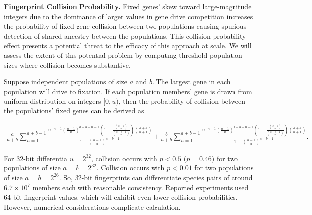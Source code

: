 \textbf{Fingerprint Collision Probability.}
Fixed genes' skew toward large-magnitude integers due to the dominance of larger values in gene drive competition increases the probability of fixed-gene collision between two populations causing spurious detection of shared ancestry between the populations.
This collision probability effect presents a potential threat to the efficacy of this approach at scale.
We will assess the extent of this potential problem by computing threshold population sizes where collision becomes substantive.

Suppose independent populations of size $a$ and $b$.
The largest gene in each population will drive to fixation.
If each population members' gene is drawn from uniform distribution on integers $[0, u)$, then the probability of collision between the populations' fixed genes can be derived as

\begin{scriptsize}
\begin{align*}
\frac{a}{a + b}\sum_{n=1}^{a + b - 1} \frac{u^{- n - 1} \left(\frac{u - 1}{u}\right)^{a + b - n - 1} \left(1 - \frac{{\binom{a - 1}{n}}}{{\binom{a + b - 1}{n}}} \right) {\binom{a + b}{n + 1}}}{1 - \left(\frac{u - 1}{u}\right)^{a + b - 1}}
+ \frac{b}{a + b} \sum_{n=1}^{a + b - 1} \frac{u^{- n - 1} \left(\frac{u - 1}{u}\right)^{a + b - n - 1} \left(1 - \frac{{\binom{b - 1}{n}}}{{\binom{a + b - 1}{n}}} \right) {\binom{a + b}{n + 1}}}{1 - \left(\frac{u - 1}{u}\right)^{a + b - 1}}.
\end{align*}
\end{scriptsize}

For 32-bit differentia $u = 2^{32}$, collision occurs with $p < 0.5$ ($p = 0.46$) for two populations of size $a = b = 2^{32}$.
Collision occurs with $p < 0.01$ for two populations of size $a = b = 2^{26}$.
So, 32-bit fingerprints can differentiate species pairs of around$ 6.7 \times 10^{7}$ members each with reasonable consistency.
Reported experiments used 64-bit fingerprint values, which will exhibit even lower collision probabilities.
However, numerical considerations complicate calculation.
